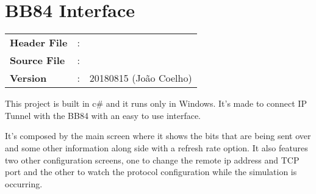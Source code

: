 \clearpage

\section{BB84 Interface}

\begin{tcolorbox}	
	\begin{tabular}{p{2.75cm} p{0.2cm} p{10.5cm}} 	
		\textbf{Header File}   &:&  \\
		\textbf{Source File}   &:&  \\
        \textbf{Version}       &:& 20180815 (Jo\~ao Coelho) \\
	\end{tabular}
\end{tcolorbox}

This project is built in c\# and it runs only in Windows. It's made to connect IP Tunnel with the BB84 with an easy to use interface.
\par
It's composed by the main screen where it shows the bits that are being sent over and some other information along side with a refresh rate option. It also features two other configuration screens, one to change the remote ip address and TCP port and the other to watch the protocol configuration while the simulation is occurring.

